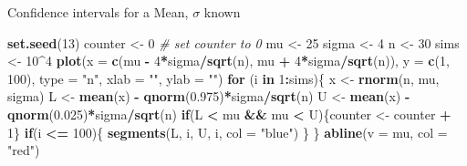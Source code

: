 \documentclass[
  ignorenonframetext,
]{beamer}
\newenvironment{Shaded}{\begin{snugshade}}{\end{snugshade}}
\newcommand{\AttributeTok}[1]{\textcolor[rgb]{0.13,0.29,0.53}{#1}}
\newcommand{\CommentTok}[1]{\textcolor[rgb]{0.56,0.35,0.01}{\textit{#1}}}
\newcommand{\ControlFlowTok}[1]{\textcolor[rgb]{0.13,0.29,0.53}{\textbf{#1}}}
\newcommand{\DecValTok}[1]{\textcolor[rgb]{0.00,0.00,0.81}{#1}}
\newcommand{\FloatTok}[1]{\textcolor[rgb]{0.00,0.00,0.81}{#1}}
\newcommand{\FunctionTok}[1]{\textcolor[rgb]{0.13,0.29,0.53}{\textbf{#1}}}
\newcommand{\NormalTok}[1]{#1}
\newcommand{\OtherTok}[1]{\textcolor[rgb]{0.56,0.35,0.01}{#1}}
\newcommand{\SpecialCharTok}[1]{\textcolor[rgb]{0.81,0.36,0.00}{\textbf{#1}}}
\newcommand{\StringTok}[1]{\textcolor[rgb]{0.31,0.60,0.02}{#1}}
\begin{document}
\begin{frame}[fragile]{Confidence intervals for a Mean, \(\sigma\)
known}
\protect\hypertarget{confidence-intervals-for-a-mean-sigma-known-5}{}
\tiny

\begin{Shaded}
\begin{Highlighting}[]
\FunctionTok{set.seed}\NormalTok{(}\DecValTok{13}\NormalTok{)}
\NormalTok{counter }\OtherTok{\textless{}{-}} \DecValTok{0} \CommentTok{\# set counter to 0}
\NormalTok{mu }\OtherTok{\textless{}{-}} \DecValTok{25}
\NormalTok{sigma }\OtherTok{\textless{}{-}} \DecValTok{4}
\NormalTok{n }\OtherTok{\textless{}{-}} \DecValTok{30}
\NormalTok{sims }\OtherTok{\textless{}{-}} \DecValTok{10}\SpecialCharTok{\^{}}\DecValTok{4}
\FunctionTok{plot}\NormalTok{(}\AttributeTok{x =} \FunctionTok{c}\NormalTok{(mu }\SpecialCharTok{{-}} \DecValTok{4}\SpecialCharTok{*}\NormalTok{sigma}\SpecialCharTok{/}\FunctionTok{sqrt}\NormalTok{(n), mu }\SpecialCharTok{+} \DecValTok{4}\SpecialCharTok{*}\NormalTok{sigma}\SpecialCharTok{/}\FunctionTok{sqrt}\NormalTok{(n)), }\AttributeTok{y =} \FunctionTok{c}\NormalTok{(}\DecValTok{1}\NormalTok{, }\DecValTok{100}\NormalTok{), }\AttributeTok{type =} \StringTok{"n"}\NormalTok{, }\AttributeTok{xlab =} \StringTok{""}\NormalTok{, }\AttributeTok{ylab =} \StringTok{""}\NormalTok{)}
\ControlFlowTok{for}\NormalTok{ (i }\ControlFlowTok{in} \DecValTok{1}\SpecialCharTok{:}\NormalTok{sims)\{}
\NormalTok{ x }\OtherTok{\textless{}{-}} \FunctionTok{rnorm}\NormalTok{(n, mu, sigma)}
\NormalTok{ L }\OtherTok{\textless{}{-}} \FunctionTok{mean}\NormalTok{(x) }\SpecialCharTok{{-}} \FunctionTok{qnorm}\NormalTok{(}\FloatTok{0.975}\NormalTok{)}\SpecialCharTok{*}\NormalTok{sigma}\SpecialCharTok{/}\FunctionTok{sqrt}\NormalTok{(n)}
\NormalTok{ U }\OtherTok{\textless{}{-}} \FunctionTok{mean}\NormalTok{(x) }\SpecialCharTok{{-}} \FunctionTok{qnorm}\NormalTok{(}\FloatTok{0.025}\NormalTok{)}\SpecialCharTok{*}\NormalTok{sigma}\SpecialCharTok{/}\FunctionTok{sqrt}\NormalTok{(n)}
 \ControlFlowTok{if}\NormalTok{(L }\SpecialCharTok{\textless{}}\NormalTok{ mu }\SpecialCharTok{\&\&}\NormalTok{ mu }\SpecialCharTok{\textless{}}\NormalTok{ U)\{counter }\OtherTok{\textless{}{-}}\NormalTok{ counter }\SpecialCharTok{+} \DecValTok{1}\NormalTok{\}}
 \ControlFlowTok{if}\NormalTok{(i }\SpecialCharTok{\textless{}=} \DecValTok{100}\NormalTok{)\{}
 \FunctionTok{segments}\NormalTok{(L, i, U, i, }\AttributeTok{col =} \StringTok{"blue"}\NormalTok{)}
\NormalTok{ \}}
\NormalTok{\}}
\FunctionTok{abline}\NormalTok{(}\AttributeTok{v =}\NormalTok{ mu, }\AttributeTok{col =} \StringTok{"red"}\NormalTok{)}
\end{Highlighting}
\end{Shaded}

\normalsize
\end{frame}
\end{document}
